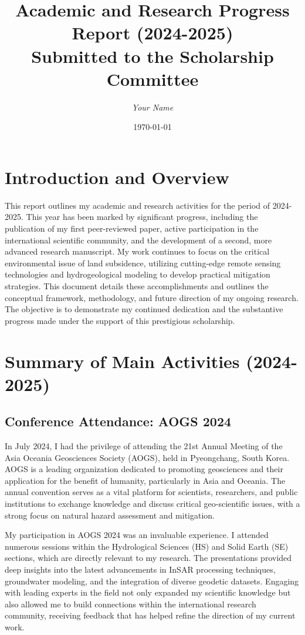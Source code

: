 \documentclass[12pt, a4paper]{article}
\title{
	\huge{\textbf{Academic and Research Progress Report (2024-2025)}} \\
	\vspace{1cm}
	\large{Submitted to the Scholarship Committee} \\
	\vspace{2cm}
}
\author{\textit{Your Name}}
\date{\today}
\begin{document}
	
	\maketitle
	\thispagestyle{empty}
	\newpage
	
	\tableofcontents
	\newpage
	
	\section{Introduction and Overview}
	
	This report outlines my academic and research activities for the period of 2024-2025. This year has been marked by significant progress, including the publication of my first peer-reviewed paper, active participation in the international scientific community, and the development of a second, more advanced research manuscript. My work continues to focus on the critical environmental issue of land subsidence, utilizing cutting-edge remote sensing technologies and hydrogeological modeling to develop practical mitigation strategies. This document details these accomplishments and outlines the conceptual framework, methodology, and future direction of my ongoing research. The objective is to demonstrate my continued dedication and the substantive progress made under the support of this prestigious scholarship.
	
	\section{Summary of Main Activities (2024-2025)}
	
	\subsection{Conference Attendance: AOGS 2024}
	
	In July 2024, I had the privilege of attending the 21st Annual Meeting of the Asia Oceania Geosciences Society (AOGS), held in Pyeongchang, South Korea. AOGS is a leading organization dedicated to promoting geosciences and their application for the benefit of humanity, particularly in Asia and Oceania. The annual convention serves as a vital platform for scientists, researchers, and public institutions to exchange knowledge and discuss critical geo-scientific issues, with a strong focus on natural hazard assessment and mitigation.
	
	My participation in AOGS 2024 was an invaluable experience. I attended numerous sessions within the Hydrological Sciences (HS) and Solid Earth (SE) sections, which are directly relevant to my research. The presentations provided deep insights into the latest advancements in InSAR processing techniques, groundwater modeling, and the integration of diverse geodetic datasets. Engaging with leading experts in the field not only expanded my scientific knowledge but also allowed me to build connections within the international research community, receiving feedback that has helped refine the direction of my current work.
	
\end{document}
